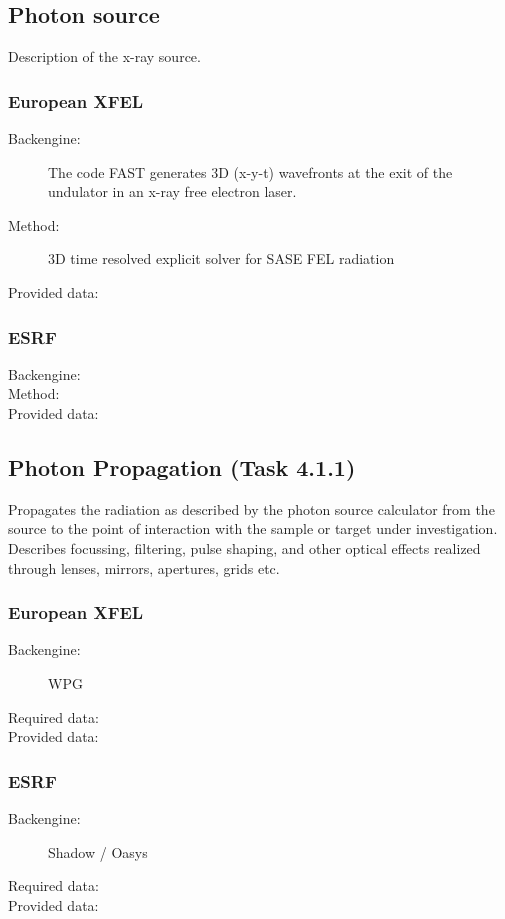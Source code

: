 \documentclass[12pt]{scrartcl}
\begin{document}
\subsection{Photon source}
Description of the x-ray source.
\subsubsection{European XFEL}
\begin{description}
  \item[Backengine:] The code FAST \cite{Saldin1999} generates 3D (x-y-t) wavefronts at the exit of the undulator in an x-ray free electron laser.
  \item[Method:] 3D time resolved explicit solver for SASE FEL radiation
  \item[Provided data:]
\end{description}

\subsubsection{ESRF}
\begin{description}
  \item[Backengine:]
  \item[Method:]
  \item[Provided data:]
\end{description}

\subsection{Photon Propagation (Task 4.1.1)}
Propagates the radiation as described by the photon source calculator from the
source to the point of interaction with the sample or target under
investigation. Describes focussing, filtering, pulse shaping, and other optical
effects realized through lenses, mirrors, apertures, grids etc.
\subsubsection{European XFEL}
\begin{description}
  \item[Backengine:] WPG \cite{Samoylova2016, wpg_github}
  \item[Required data:]
  \item[Provided data:]
\end{description}
%
\subsubsection{ESRF}
\begin{description}
  \item[Backengine:] Shadow / Oasys
  \item[Required data:]
  \item[Provided data:]
\end{description}
\end{document}
